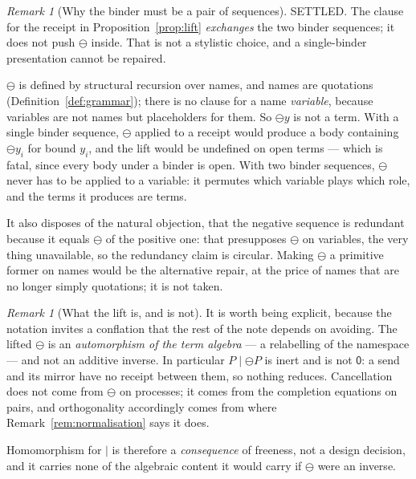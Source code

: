 \documentclass[11pt]{article}
\theoremstyle{definition}
\theoremstyle{remark}
\newtheorem{remark}[theorem]{Remark}
\newcommand{\pzero}{\mathsf{0}}
\newcommand{\negop}{\ensuremath{\ominus}}
\begin{document}
\begin{remark}[Why the binder must be a pair of sequences]
\label{rem:whypairbinder}
SETTLED. The clause for the receipt in Proposition~\ref{prop:lift}
\emph{exchanges} the two binder sequences; it does not push $\negop$ inside.
That is not a stylistic choice, and a single-binder presentation cannot be
repaired.

$\negop$ is defined by structural recursion over names, and names are
quotations (Definition~\ref{def:grammar}); there is no clause for a name
\emph{variable}, because variables are not names but placeholders for them. So
$\negop y$ is not a term. With a single binder sequence, $\negop$ applied to a
receipt would produce a body containing $\negop y_i$ for bound $y_i$, and the
lift would be undefined on open terms --- which is fatal, since every body under
a binder is open. With two binder sequences, $\negop$ never has to be applied to
a variable: it permutes which variable plays which role, and the terms it
produces are terms.

It also disposes of the natural objection, that the negative sequence is
redundant because it equals $\negop$ of the positive one: that presupposes
$\negop$ on variables, the very thing unavailable, so the redundancy claim is
circular. Making
$\negop$ a primitive former on names would be the alternative repair, at the
price of names that are no longer simply quotations; it is not taken.
\end{remark}

\begin{remark}[What the lift is, and is not]
\label{rem:whatlift}
It is worth being explicit, because the notation invites a conflation that the
rest of the note depends on avoiding. The lifted $\negop$ is an
\emph{automorphism of the term algebra} --- a relabelling of the namespace ---
and not an additive inverse. In particular $P \mid \negop P$ is inert and is not
$\pzero$: a send and its mirror have no receipt between them, so nothing
reduces. Cancellation does not come from $\negop$ on processes; it comes from
the completion equations on pairs, and orthogonality accordingly comes from
where Remark~\ref{rem:normalisation} says it does.

Homomorphism for $\mid$ is therefore a \emph{consequence} of freeness, not a
design decision, and it carries none of the algebraic content it would carry if
$\negop$ were an inverse.
\end{remark}
\end{document}
